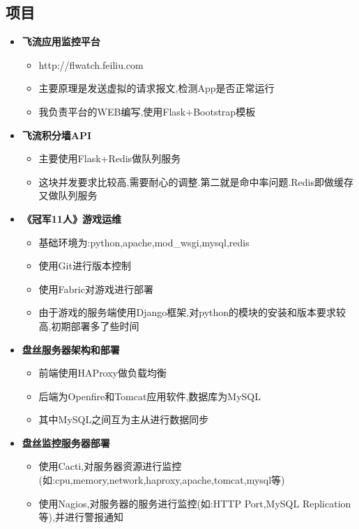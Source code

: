 \documentclass[11pt,letterpaper]{article}
\newcommand{\resitem}[1]{\item #1 \vspace{-2pt}}
\begin{document}
\begin{CJK}{UTF8}{gbsn}
\section{项目}  
       \begin{itemize}
		   \item{\textbf{飞流应用监控平台}}\vspace{-6pt}
                       {\footnotesize
                       \begin{itemize}
							   \resitem{http://flwatch.feiliu.com}
							   \resitem{主要原理是发送虚拟的请求报文,检测App是否正常运行}
                               \resitem{我负责平台的WEB编写,使用Flask+Bootstrap模板}
                       \end{itemize}
                       } 
		   \item{\textbf{飞流积分墙API}}\vspace{-6pt}
                       {\footnotesize
                       \begin{itemize}
							   \resitem{主要使用Flask+Redis做队列服务}
                               \resitem{这块并发要求比较高,需要耐心的调整.第二就是命中率问题.Redis即做缓存又做队列服务}
                       \end{itemize}
                       } 
		   \item{\textbf{《冠军11人》游戏运维}}\vspace{-6pt}
                       {\footnotesize
                       \begin{itemize}
							   \resitem{基础环境为:python,apache,mod\_wsgi,mysql,redis}
							   \resitem{使用Git进行版本控制}
							   \resitem{使用Fabric对游戏进行部署}
                               \resitem{由于游戏的服务端使用Django框架,对python的模块的安装和版本要求较高,初期部署多了些时间}
                       \end{itemize}
                       } 
		   \item{\textbf{盘丝服务器架构和部署}}\vspace{-6pt}
                       {\footnotesize
                       \begin{itemize}
                               \resitem{前端使用HAProxy做负载均衡}
                               \resitem{后端为Openfire和Tomcat应用软件,数据库为MySQL}
                               \resitem{其中MySQL之间互为主从进行数据同步}
                       \end{itemize}
                       } 
		   \item{\textbf{盘丝监控服务器部署}}\vspace{-6pt}
                       {\footnotesize
                       \begin{itemize}
                               \resitem{使用Cacti,对服务器资源进行监控(如:cpu,memory,network,haproxy,apache,tomcat,mysql等)}
                               \resitem{使用Nagios,对服务器的服务进行监控(如:HTTP Port,MySQL Replication等),并进行警报通知}
                       \end{itemize}
                       }
		\end{itemize}


\end{CJK}
\end{document}
